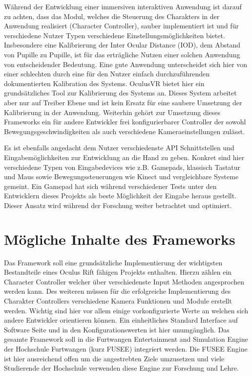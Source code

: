 \documentclass[pagesize, paper=a4, fontsize=12pt,titlepage=true, headings=small, headnosepline, abstractoff, liststotoc, nochapterprefix, plainheadsepline, twoside]{scrreprt}
\begin{document}
Während der Entwicklung einer immersiven interaktiven Anwendung ist darauf zu achten, dass das Modul, welches die Steuerung des Charakters in der Anwendung realisiert (Character Controller), sauber implementiert ist und für verschiedene Nutzer Typen verschiedene Einstellungsmöglichkeiten bietet. Insbesondere eine Kalibrierung der Inter Ocular Distance (IOD), dem Abstand von Pupille zu Pupille, ist für das erträgliche Nutzen einer solchen Anwendung von entscheidender Bedeutung. Eine gute Anwendung unterscheidet sich hier von einer schlechten durch eine für den Nutzer einfach durchzuführenden dokumentierten Kalibration des Systems. OculusVR bietet hier ein grundsätzliches Tool zur Kalibrierung des Systems an. Dieses System arbeitet aber nur auf Treiber Ebene und ist kein Ersatz für eine saubere Umsetzung der Kalibrierung in der Anwendung.
Weiterhin gehört zur Umsetzung dieses Frameworks ein für andere Entwickler frei konfigurierbarer Controller der sowohl Bewegungsgeschwindigkeiten als auch verschiedene Kameraeinstellungen zulässt.

Es ist ebenfalls angedacht dem Nutzer verschiedenste API Schnittstellen und Eingabemöglichkeiten zur Entwicklung an die Hand zu geben. Konkret sind hier verschiedene Typen von Eingabedevices wie z.B. Gamepads, klassisch Tastatur und Maus sowie Bewegungssteuerungen wie Kinect und vergleichbare Systeme gemeint. Ein Gamepad hat sich während verschiedener Tests unter den Entwicklern dieses Projekts als beste Möglichkeit der Eingabe heraus gestellt. Dieser Ansatz wird während der Forschung weiter betrachtet und optimiert.


\section{Mögliche Inhalte des Frameworks}
Das Framework soll eine grundsätzliche Implementierung der wichtigsten Bestandteile eines Oculus Rift fähigen Projekts enthalten. Hierzu zählen ein Character Controller welcher über verschiedenste Input Methoden angesprochen werden kann. Des weiteren müssen für die erfolgreiche Implementierung des Charakter Controllers verschiedene Kamera Funktionen und Module erstellt werden. Wichtig sind hier vor allem einige vorkonfigurierte Werte an welchen sich andere Entwickler orientieren können. Ein einheitliches Standard Interface auf Software Seite und in den Konfigurationswerten ist hier unumgänglich. Das gesamte Framework soll in die Furtwangen Entertainment and Simulation Engine der Hochschule Furtwangen (kurz FUSEE) integriert werden. Die FUSEE Engine ist hier ausreichend offen um die angestrebten Ziele umzusetzen und viele Studierende der Hochschule verwenden diese Engine zur Forschung und Lehre.
\end{document}
